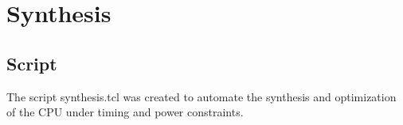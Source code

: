 \chapter{Synthesis}
\label{Synthesis}
\section{Script}
The script synthesis.tcl was created to automate the synthesis and optimization of the CPU under timing and power constraints.